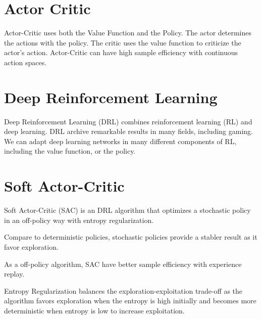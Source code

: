 \section{Actor Critic}
Actor-Critic uses both the Value Function and the Policy. The actor determines the actions with the policy. The critic uses the value function to criticize the actor's action. Actor-Critic can have high sample efficiency with continuous action spaces.

\section{Deep Reinforcement Learning}
Deep Reinforcement Learning (DRL) combines reinforcement learning (RL) and deep learning. DRL archive remarkable results in many fields, including gaming. We can adapt deep learning networks in many different components of RL, including the value function, or the policy.
\section{Soft Actor-Critic}
Soft Actor-Critic (SAC) is an DRL algorithm that optimizes a stochastic policy in an off-policy way with entropy regularization.
\par
Compare to deterministic policies, stochastic policies provide a stabler result as it favor exploration.
\par 
As a off-policy algorithm, SAC have better sample efficiency with experience replay.
\par
Entropy Regularization balances the exploration-exploitation trade-off as the algorithm favors exploration when the entropy is high initially and becomes more deterministic when entropy is low to increase exploitation.